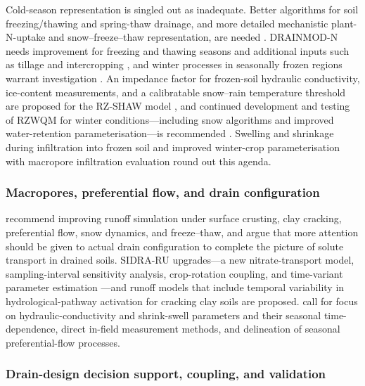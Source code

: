 \documentclass[11pt]{article}
\begin{document}
Cold-season representation is singled out as inadequate. Better algorithms for soil freezing/thawing and spring-thaw drainage, and more detailed mechanistic plant-N-uptake and snow--freeze--thaw representation, are needed \parencite{Feyereisen2006b}. DRAINMOD-N needs improvement for freezing and thawing seasons and additional inputs such as tillage and intercropping \parencite{Yang2007}, and winter processes in seasonally frozen regions warrant investigation \parencite{Saadat2020,Jiang2020}. An impedance factor for frozen-soil hydraulic conductivity, ice-content measurements, and a calibratable snow--rain temperature threshold are proposed for the RZ-SHAW model \parencite{Li2024b}, and continued development and testing of RZWQM for winter conditions---including snow algorithms and improved water-retention parameterisation---is recommended \parencite{Ahmed2007b,Ahmed2007,Yang2021}. Swelling and shrinkage during infiltration into frozen soil \parencite{Roy2020} and improved winter-crop parameterisation with macropore infiltration evaluation \parencite{Motarjemi2021} round out this agenda.

\subsubsection{Macropores, preferential flow, and drain configuration}

\textcite{Smith2020} recommend improving runoff simulation under surface crusting, clay cracking, preferential flow, snow dynamics, and freeze--thaw, and \textcite{Stamm2002} argue that more attention should be given to actual drain configuration to complete the picture of solute transport in drained soils. SIDRA-RU upgrades---a new nitrate-transport model, sampling-interval sensitivity analysis, crop-rotation coupling, and time-variant parameter estimation \parencite{Chelil2022b,Jeantet2021}---and runoff models that include temporal variability in hydrological-pathway activation for cracking clay soils \parencite{Kokulan2019} are proposed. \textcite{Boivin2006} call for focus on hydraulic-conductivity and shrink-swell parameters and their seasonal time-dependence, direct in-field measurement methods, and delineation of seasonal preferential-flow processes.

\subsubsection{Drain-design decision support, coupling, and validation}
\end{document}
